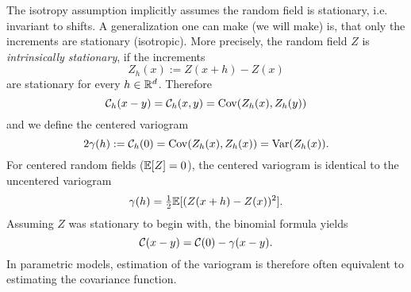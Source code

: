 The isotropy assumption implicitly assumes the random field is stationary,
i.e. invariant to shifts. A generalization one can make (we will make)
is, that only the increments are stationary (isotropic). More precisely, the
random field \(Z\) is \emph{intrinsically stationary}, if the increments
\[
	Z_h(x) := Z(x+h) - Z(x)
\]
are stationary for every \(h\in\mathbb{R}^d\). Therefore
\[
	\mathcal{C}_h(x-y) = \mathcal{C}_h(x,y) = \operatorname{Cov}(Z_h(x), Z_h(y))
\]
and we define the centered variogram
\[
	2\gamma(h):= \mathcal{C}_h(0) = \operatorname{Cov}(Z_h(x), Z_h(x))= \operatorname{Var}(Z_h(x)).
\]
For centered random fields (\(\mathbb{E}[Z]=0\)), the centered variogram is identical
to the uncentered variogram
\[
	\gamma(h) = \tfrac12\mathbb{E}[(Z(x+h)-Z(x))^2].
\]
Assuming \(Z\) was stationary to begin with, the binomial formula yields 
\[
	\mathcal{C}(x-y) = \mathcal{C}(0) - \gamma(x-y).
\]
In parametric models, estimation of the variogram is therefore often equivalent
to estimating the covariance function.
